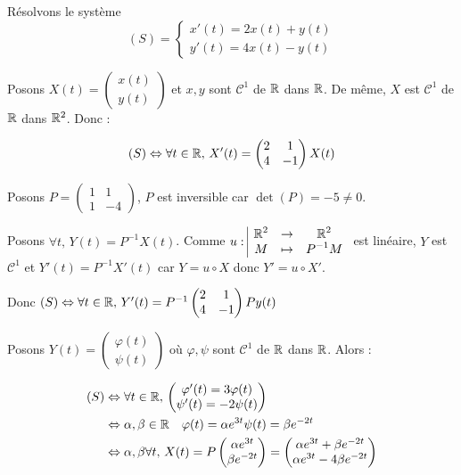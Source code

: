 \begin{exemple}
    Résolvons le système 
    \[(S) = \begin{cases}
        x'(t) = 2x(t) + y(t) \\
        y'(t) = 4x(t) - y(t)
    \end{cases}\]

    Posons $X(t) = \begin{pmatrix} x(t) \\ y(t) \end{pmatrix}$ et $x, y$ sont $\mathscr C^1$ 
    de $\mathbb{R}$ dans $\mathbb{R}$. De même, $X$ est $\mathscr C^1$ de $\mathbb{R}$ dans $\mathbb{R}^2$. Donc : 

    $$(S) \Leftrightarrow \forall t \in \mathbb{R}, \, X'(t) = \begin{pmatrix} 2 & 1 \\ 4 & -1 \end{pmatrix} X(t)$$

    Posons $P = \begin{pmatrix} 1 & 1 \\ 1 & -4 \end{pmatrix}$, $P$ est inversible car $\det(P) = -5 \neq 0$.

    Posons $\forall t, \, Y(t) = P^{-1}X(t)$. Comme $u: \space \begin{array}{|ccc} \displaystyle \mathbb{R}^2 & \to & \displaystyle \mathbb{R}^2 \\ \displaystyle M & \mapsto & \displaystyle P^{-1}M \end{array}$ est linéaire, 
    $Y$ est $\mathscr C^1$ et $Y'(t) = P^{-1}X'(t)$ car $Y = u \circ X$ donc $Y' = u \circ X'$.

    Donc $(S) \Leftrightarrow \forall t \in \mathbb{R}, \, Y'(t) = P^{-1} \begin{pmatrix} 2 & 1 \\ 4 & -1 \end{pmatrix} P y(t)$

    Posons $Y(t) = \begin{pmatrix} \varphi(t) \\ \psi(t) \end{pmatrix}$ où 
    $\varphi, \psi$ sont $\mathscr C^1$ de $\mathbb{R}$ dans $\mathbb{R}$. Alors : 

    \begin{align*}
        (S) & \Leftrightarrow \forall t \in \mathbb{R}, \, \begin{pmatrix} \varphi'(t)  = 3\varphi(t) \\ \psi'(t) = -2\psi(t) \end{pmatrix}\\
    & \Leftrightarrow \alpha, \beta \in \mathbb{R} \quad \varphi(t) = \alpha e^{3t} \space \psi(t) = \beta e^{-2t}\\
    & \Leftrightarrow \alpha, \beta \forall t, \, X(t) = P \begin{pmatrix} \alpha e^{3t} \\ \beta e^{-2t} \end{pmatrix} = \begin{pmatrix} \alpha e^{3t} + \beta e^{-2t} \\ \alpha e^{3t} - 4\beta e^{-2t} \end{pmatrix}
    \end{align*}
    
\end{exemple}


